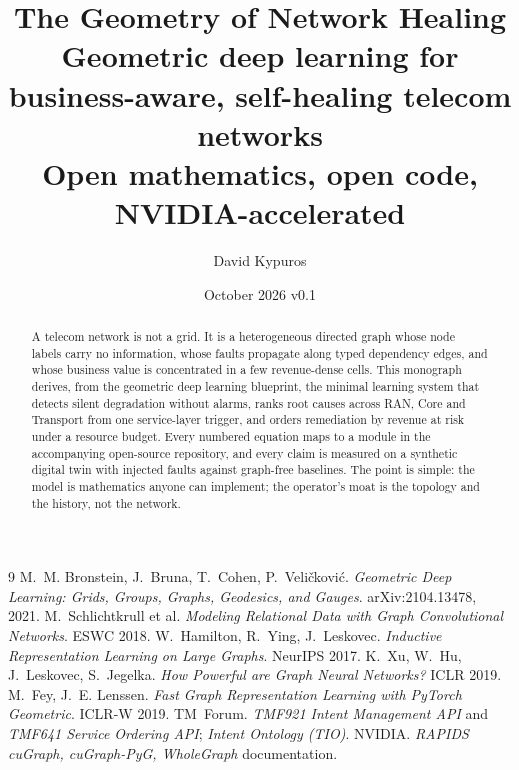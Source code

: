 \documentclass[11pt,a4paper]{report}
\title{\vspace{-2em}\textbf{The Geometry of Network Healing}\\[0.4em]
\large Geometric deep learning for business-aware, self-healing telecom networks\\[0.3em]
\normalsize Open mathematics, open code, NVIDIA-accelerated}
\author{David Kypuros}
\date{October 2026 \quad\textperiodcentered\quad v0.1}
\begin{document}
\maketitle

\begin{abstract}
\noindent
A telecom network is not a grid. It is a heterogeneous directed graph whose node labels carry no
information, whose faults propagate along typed dependency edges, and whose business value is
concentrated in a few revenue-dense cells. This monograph derives, from the geometric deep learning
blueprint, the minimal learning system that detects silent degradation without alarms, ranks root
causes across RAN, Core and Transport from one service-layer trigger, and orders remediation by
revenue at risk under a resource budget. Every numbered equation maps to a module in the
accompanying open-source repository, and every claim is measured on a synthetic digital twin with
injected faults against graph-free baselines. The point is simple: the model is mathematics anyone
can implement; the operator's moat is the topology and the history, not the network.
\end{abstract}

\tableofcontents












\appendix



\begin{thebibliography}{9}
 M.~M. Bronstein, J.~Bruna, T.~Cohen, P.~Veli\v{c}kovi\'c.
\emph{Geometric Deep Learning: Grids, Groups, Graphs, Geodesics, and Gauges}. arXiv:2104.13478, 2021.
 M.~Schlichtkrull et al. \emph{Modeling Relational Data with Graph Convolutional Networks}. ESWC 2018.
 W.~Hamilton, R.~Ying, J.~Leskovec. \emph{Inductive Representation Learning on Large Graphs}. NeurIPS 2017.
 K.~Xu, W.~Hu, J.~Leskovec, S.~Jegelka. \emph{How Powerful are Graph Neural Networks?} ICLR 2019.
 M.~Fey, J.~E. Lenssen. \emph{Fast Graph Representation Learning with PyTorch Geometric}. ICLR-W 2019.
 TM~Forum. \emph{TMF921 Intent Management API} and \emph{TMF641 Service Ordering API}; \emph{Intent Ontology (TIO)}.
 NVIDIA. \emph{RAPIDS cuGraph, cuGraph-PyG, WholeGraph} documentation.
\end{thebibliography}
\end{document}
